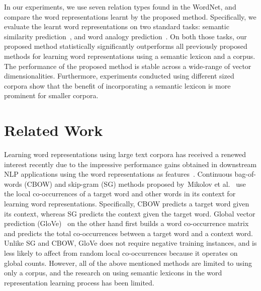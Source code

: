 \documentclass[letterpaper]{article}
\begin{document}
In our experiments, we use seven relation types found in the WordNet, and compare the word representations
learnt by the proposed method.
Specifically, we evaluate the learnt word representations on two standard tasks:
semantic similarity prediction~\cite{Bollegala:NAACL:2007}, and word analogy prediction~\cite{Duc:AAAI:2011}.
On both those tasks, our proposed method statistically significantly outperforms all
previously proposed methods for learning word representations using a semantic lexicon and a corpus.
The performance of the proposed method is stable across a wide-range of vector dimensionalities.
Furthermore, experiments conducted using different sized corpora show that the benefit of incorporating a semantic lexicon
is more prominent for smaller corpora.


\section{Related Work}
\label{sec:related}



Learning word representations using large text corpora has received a renewed interest recently due to the
impressive performance gains obtained in downstream NLP applications using the word representations as features~\cite{Collobert:2011,Turian:ACL:2010}.
Continuous bag-of-words (CBOW)  and skip-gram (SG) methods proposed by~Mikolov et al.~\cite{Milkov:2013}
use the local co-occurrences of a target word and other words in its context for learning word representations.
Specifically, CBOW predicts a target word given its context, whereas SG predicts the context given the target word.
Global vector prediction (GloVe)~\cite{Pennington:EMNLP:2014} on the other hand first builds a word co-occurrence
matrix and predicts the total co-occurrences between a target word and a context word.
Unlike SG and CBOW, GloVe does not require negative training instances, and is less likely to affect from random local
co-occurrences because it operates on global counts.
However, all of the above mentioned methods are limited to using only a corpus, and
the research on using semantic lexicons in the word representation learning process has been limited.
\end{document}
